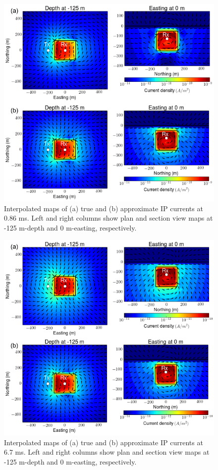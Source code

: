 \documentclass[a4paper, 11pt]{article}
\begin{document}
\begin{figure}[htb]
  \centering
  \includegraphics[width=1\textwidth]{figures/IPcurrent_PlanandSec_early.png}
  \caption{Interpolated maps of (a) true and (b) approximate IP currents at 0.86 ms. Left and right columns show plan and section view maps at -125 m-depth and 0 m-easting, respectively. }
  \label{F:IPcurrent_PlanandSec_early}
\end{figure}

\begin{figure}[htb]
  \centering
  \includegraphics[width=1\textwidth]{figures/IPcurrent_PlanandSec_late.png}
  \caption{Interpolated maps of (a) true and (b) approximate IP currents at 6.7 ms. Left and right columns show plan and section view maps at -125 m-depth and 0 m-easting, respectively. }
  \label{F:IPcurrent_PlanandSec_late}
\end{figure}
\end{document}
